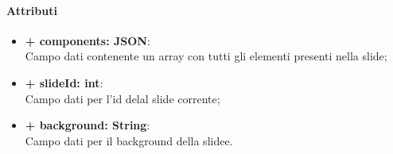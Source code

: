 	\paragraph{Attributi}
	\begin{itemize}
		\item \textbf{+ components: JSON}:\\
		Campo dati contenente un array con tutti gli elementi presenti nella slide;
		\item \textbf{+ slideId: int}:\\
		Campo dati per l'id delal slide corrente;
		\item \textbf{+ background: String}:\\
		Campo dati per il background della slidee.
	\end{itemize}